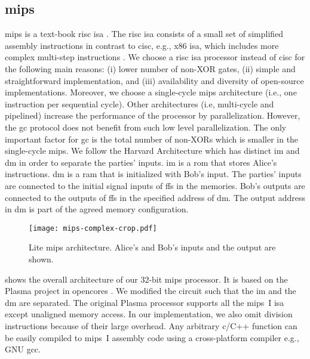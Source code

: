 \subsection{\gls{mips}}\label{ssec:processor-mips}
\gls{mips} is a text-book \acrfull{risc} \acrshort{isa} \cite{kane1992mips}.
The \acrshort{risc} \acrshort{isa} consists of a small set of simplified assembly instructions in contrast to \acrfull{cisc}, e.g., x86 \acrshort{isa}, which includes more complex multi-step instructions \cite{hennessy2012computer}.
We choose a \acrshort{risc} \acrshort{isa} processor instead of \acrshort{cisc} for the following main reasons: (i) lower number of non-XOR gates, (ii) simple and straightforward implementation, and (iii) availability and diversity of open-source implementations.
Moreover, we choose a single-cycle \gls{mips} architecture (i.e., one instruction per sequential cycle).
Other architectures (i.e, multi-cycle and pipelined) increase the performance of the processor by parallelization.
However, the \acrshort{gc} protocol does not benefit from such low level parallelization.
The only important factor for \acrshort{gc} is the total number of non-XORs which is smaller in the single-cycle \gls{mips}.
We follow the Harvard Architecture which has distinct \acrfull{im} and \acrfull{dm} in order to separate the parties' inputs.
\acrshort{im} is a \acrfull{rom} that stores Alice's instructions.
\acrshort{dm} is a \acrfull{ram} that is initialized with Bob's input.
The parties' inputs are connected to the initial signal inputs of \acrshort{ff}s in the memories.
Bob's outputs are connected to the outputs of \acrshort{ff}s in the specified address of \acrshort{dm}.
The output address in \acrshort{dm} is part of the agreed memory configuration.

\begin{figure}[h]
\centering
\texttt{[image: mips-complex-crop.pdf]}
\caption{Lite \gls{mips} architecture.
  Alice's and Bob's inputs and the output are shown.}\label{figure:mips}
\end{figure}

 shows the overall architecture of our 32-bit \gls{mips} processor.
It is based on the Plasma project in opencores \cite{rhoads2006plasma}.
We modified the circuit such that the \acrshort{im} and the \acrshort{dm} are separated.
The original Plasma processor supports all the \gls{mips}~I \acrshort{isa} except unaligned memory access.
In our implementation, we also omit division instructions because of their large overhead.
Any arbitrary \gls{c}/C++ function can be easily compiled to \gls{mips}~I assembly code using a cross-platform compiler e.g., GNU gcc.

